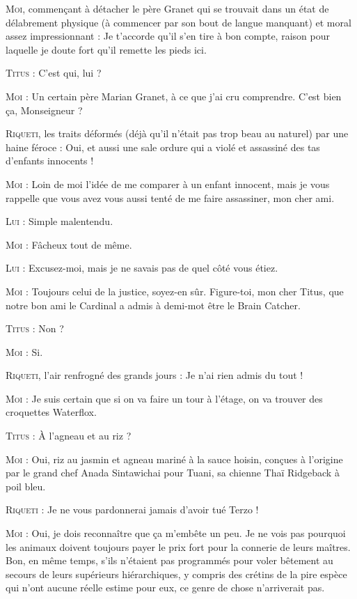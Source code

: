 \textsc{Moi}, commençant à détacher le père Granet qui se trouvait dans un état de délabrement physique (à commencer par son bout de langue manquant) et moral assez impressionnant : Je t’accorde qu’il s’en tire à bon compte, raison pour laquelle je doute fort qu’il remette les pieds ici.

\textsc{Titus} : C’est qui, lui ?

\textsc{Moi} : Un certain père Marian Granet, à ce que j’ai cru comprendre. C’est bien ça, Monseigneur ?

\textsc{Riqueti}, les traits déformés (déjà qu’il n’était pas trop beau au naturel) par une haine féroce : Oui, et aussi une sale ordure qui a violé et assassiné des tas d’enfants innocents !

\textsc{Moi} : Loin de moi l’idée de me comparer à un enfant innocent, mais je vous rappelle que vous avez vous aussi tenté de me faire assassiner, mon cher ami.

\textsc{Lui} : Simple malentendu.

\textsc{Moi} : Fâcheux tout de même.

\textsc{Lui} : Excusez-moi, mais je ne savais pas de quel côté vous étiez.

\textsc{Moi} : Toujours celui de la justice, soyez-en sûr. Figure-toi, mon cher Titus, que notre bon ami le Cardinal a admis à demi-mot être le Brain Catcher.

\textsc{Titus} : Non ?

\textsc{Moi} : Si.

\textsc{Riqueti}, l’air renfrogné des grands jours : Je n’ai rien admis du tout !

\textsc{Moi} : Je suis certain que si on va faire un tour à l’étage, on va trouver des croquettes Waterflox.

\textsc{Titus} : À l’agneau et au riz ?

\textsc{Moi} : Oui, riz au jasmin et agneau mariné à la sauce hoisin, conçues à l’origine par le grand chef Anada Sintawichai pour Tuani, sa chienne Thaï Ridgeback à poil bleu.

\textsc{Riqueti} : Je ne vous pardonnerai jamais d’avoir tué Terzo !

\textsc{Moi} : Oui, je dois reconnaître que ça m’embête un peu. Je ne vois pas pourquoi les animaux doivent toujours payer le prix fort pour la connerie de leurs maîtres. Bon, en même temps, s’ils n’étaient pas programmés pour voler bêtement au secours de leurs supérieurs hiérarchiques, y compris des crétins de la pire espèce qui n’ont aucune réelle estime pour eux, ce genre de chose n’arriverait pas.

